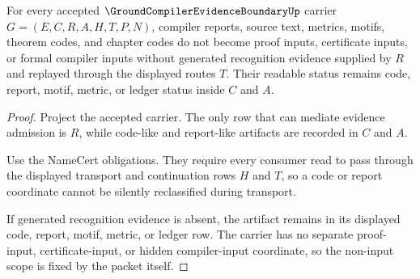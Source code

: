 \begin{theorem}
\label{thm:groundcompiler-evidence-boundary-noninput-scope}
For every accepted $\GroundCompilerEvidenceBoundaryUp$ carrier $G=(E,C,R,A,H,T,P,N)$, compiler reports, source text, metrics, motifs, theorem codes, and chapter codes do not become proof inputs, certificate inputs, or formal compiler inputs without generated recognition evidence supplied by $R$ and replayed through the displayed routes $T$. Their readable status remains code, report, motif, metric, or ledger status inside $C$ and $A$.
\end{theorem}
\begin{proof}
Project the accepted carrier. The only row that can mediate evidence admission is $R$, while code-like and report-like artifacts are recorded in $C$ and $A$.

Use the NameCert obligations. They require every consumer read to pass through the displayed transport and continuation rows $H$ and $T$, so a code or report coordinate cannot be silently reclassified during transport.

If generated recognition evidence is absent, the artifact remains in its displayed code, report, motif, metric, or ledger row. The carrier has no separate proof-input, certificate-input, or hidden compiler-input coordinate, so the non-input scope is fixed by the packet itself.
\end{proof}


\begin{closurestatus}{\GroundCompilerEvidenceBoundaryUp}
  \theoryclosure{\seedClosure}
  \formalstatus{\unformalizedV}
\end{closurestatus}
